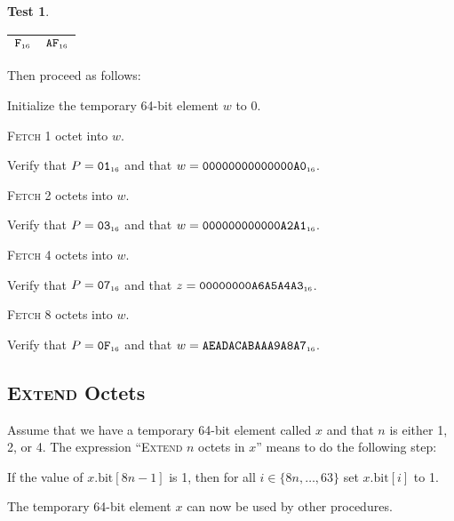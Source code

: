 \documentclass[a4paper,12pt]{article}
\makeatletter
\newcommand{\num}[1]{\texttt{#1}}
\newcommand{\hex}[1]{\num{#1}_{\textup{\tiny 16}}}
\newcommand{\MEM}[1]{\ifthenelse{\equal{#1}{}}{M}{M[#1]}}
\newcommand{\PC}{P}
\newcommand{\bitno}[2]{#1.\mathrm{bit}[#2]}
\newcommand{\range}[2]{\{#1,\ldots,#2\}}
\newcommand{\proc}[1]{\textsc{#1}}
\theoremstyle{definition}
\newtheorem{test}{Test}
\newenvironment{memtable}{%
  \begin{trivlist}
    \item
    }{%
    \end{trivlist}}
\newenvironment{memcolumn}{%
  \begin{tabular}{@{}ll@{}}
    \hline}
    {%
    \hline
  \end{tabular}}
\makeatother
\begin{document}
\begin{test}
\begin{memtable}
\begin{memcolumn}
      $\hex{F}$ & $\hex{AF}$ \\
    \end{memcolumn}
  \end{memtable}
  Then proceed as follows:
  \begin{stepnumbers}
  \item Initialize the temporary 64-bit element $w$ to 0.
  \item \proc{Fetch} 1 octet into $w$.
  \item Verify that $\PC = \hex{01}$ and that $w = \hex{00000000000000A0}$.
  \item \proc{Fetch} 2 octets into $w$.
  \item Verify that $\PC = \hex{03}$ and that $w = \hex{000000000000A2A1}$.
  \item \proc{Fetch} 4 octets into $w$.
  \item Verify that $\PC = \hex{07}$ and that $z = \hex{00000000A6A5A4A3}$.
  \item \proc{Fetch} 8 octets into $w$.
  \item Verify that $\PC = \hex{0F}$ and that $w = \hex{AEADACABAAA9A8A7}$.
  \end{stepnumbers}
\end{test}
\subsection{\proc{Extend} Octets}

Assume that we have a temporary 64-bit element called $x$ and that $n$ is either 1, 2, or 4.
The expression ``\proc{Extend} $n$ octets in $x$'' means to do the following step:
\begin{stepnumbers}
\item If the value of $\bitno{x}{8n-1}$ is 1, then for all $i \in \range{8n}{63}$ set $\bitno{x}{i}$ to 1.
\end{stepnumbers}
The temporary 64-bit element $x$ can now be used by other procedures.
\end{document}
